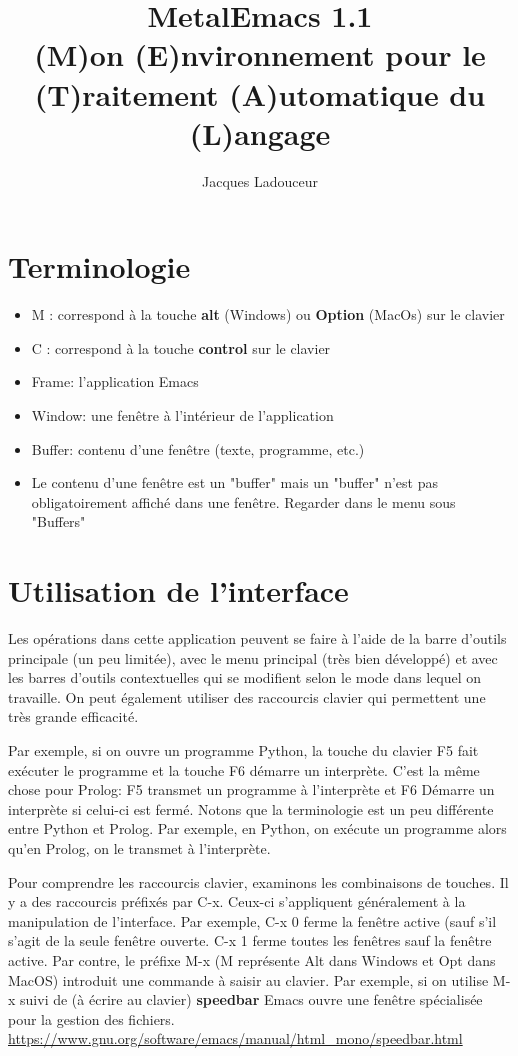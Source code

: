 \documentclass[letterpaper, 12pt]{scrartcl}
\author{Jacques Ladouceur}
\date{}
\title{\large MetalEmacs 1.1\\
(M)on (E)nvironnement pour le (T)raitement (A)utomatique du (L)angage}
\begin{document}
\maketitle
\section{Terminologie}
\label{sec:org5bc1faa}

\begin{itemize}
\item M : correspond à la touche \textbf{alt} (Windows) ou \textbf{Option} (MacOs) sur le clavier
\item C : correspond à la touche \textbf{control} sur le clavier
\item Frame: l'application Emacs
\item Window: une fenêtre à l'intérieur de l'application
\item Buffer: contenu d'une fenêtre (texte, programme, etc.)
\item Le contenu d'une fenêtre est un "buffer" mais un "buffer" n'est pas obligatoirement affiché dans une fenêtre. Regarder dans le menu sous "Buffers"
\end{itemize}
\section{Utilisation de l'interface}
\label{sec:org17e058e}

Les opérations dans cette application peuvent se faire à l'aide de la barre d'outils principale (un peu limitée), avec le menu principal (très bien développé) et avec les barres d'outils contextuelles qui se modifient selon le mode dans lequel on travaille. On peut également utiliser des raccourcis clavier qui permettent une très grande efficacité.

Par exemple, si on ouvre un programme Python, la touche du clavier F5 fait exécuter le programme et la touche F6 démarre un interprète. C'est la même chose pour Prolog: F5 transmet un programme à l'interprète et F6 Démarre un interprète si celui-ci est fermé. Notons que la terminologie est un peu différente entre Python et Prolog.  Par exemple, en Python, on exécute un programme alors qu'en Prolog, on le transmet à l'interprète. 

Pour comprendre les raccourcis clavier, examinons les combinaisons de touches. Il y a des raccourcis préfixés par C-x.  Ceux-ci s'appliquent généralement à la manipulation de l'interface.  Par exemple, C-x 0 ferme la fenêtre active (sauf s'il s'agit de la seule fenêtre ouverte. C-x 1 ferme toutes les fenêtres sauf la fenêtre active. Par contre, le préfixe  M-x (M représente Alt dans Windows et Opt dans MacOS) introduit une commande à saisir au clavier. Par exemple, si on utilise M-x suivi de (à écrire au clavier) \textbf{speedbar} Emacs ouvre une fenêtre spécialisée pour la gestion des fichiers. \url{https://www.gnu.org/software/emacs/manual/html\_mono/speedbar.html}
\end{document}
